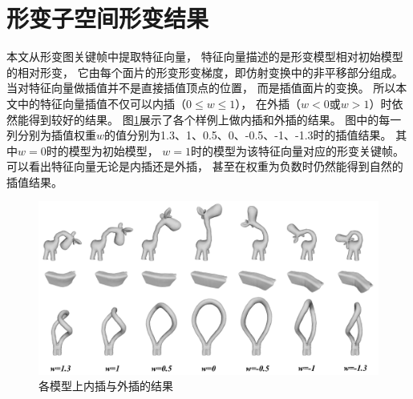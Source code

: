 \section{形变子空间形变结果}\label{sec_subspace_res}
本文从形变图关键帧中提取特征向量，
特征向量描述的是形变模型相对初始模型的相对形变，
它由每个面片的形变形变梯度，即仿射变换中的非平移部分组成。
当对特征向量做插值并不是直接插值顶点的位置，
而是插值面片的变换。
所以本文中的特征向量插值不仅可以内插（$0 \leq w \leq 1$），
在外插（$w<0$或$w>1$）时依然能得到较好的结果。
图\ref{extrapolation}展示了各个样例上做内插和外插的结果。
图中的每一列分别为插值权重$w$的值分别为1.3、1、0.5、0、-0.5、-1、-1.3时的插值结果。
其中$w=0$时的模型为初始模型，
$w=1$时的模型为该特征向量对应的形变关键帧。
可以看出特征向量无论是内插还是外插，
甚至在权重为负数时仍然能得到自然的插值结果。
\begin{figure}[h]
    \centering
    \includegraphics[width = \textwidth]{./Pictures/extrapolation.png}
    \caption{各模型上内插与外插的结果}
    \label{extrapolation}
\end{figure}

